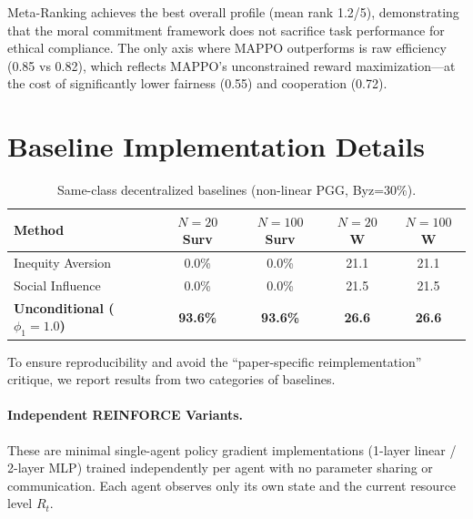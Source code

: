 \documentclass{article}
\begin{document}
\noindent Meta-Ranking achieves the best overall profile (mean rank 1.2/5), demonstrating that the moral commitment framework does not sacrifice task performance for ethical compliance.
The only axis where MAPPO outperforms is raw efficiency (0.85 vs 0.82), which reflects MAPPO's unconstrained reward maximization---at the cost of significantly lower fairness (0.55) and cooperation (0.72).

\section{Baseline Implementation Details}
\label{app:baselines}

\begin{table}[h]
\centering
\caption{Same-class decentralized baselines (non-linear PGG, Byz=30\%).}
\label{tab:baselines}
\begin{tabular}{lcccc}
\toprule
\textbf{Method} & \textbf{$N{=}20$ Surv} & \textbf{$N{=}100$ Surv} & \textbf{$N{=}20$ W} & \textbf{$N{=}100$ W} \\
\midrule
Inequity Aversion & 0.0\% & 0.0\% & 21.1 & 21.1 \\
Social Influence & 0.0\% & 0.0\% & 21.5 & 21.5 \\
\midrule
\textbf{Unconditional ($\phi_1{=}1.0$)} & \textbf{93.6\%} & \textbf{93.6\%} & \textbf{26.6} & \textbf{26.6} \\
\bottomrule
\end{tabular}
\end{table}

To ensure reproducibility and avoid the ``paper-specific reimplementation'' critique, we report results from two categories of baselines.

\paragraph{Independent REINFORCE Variants.}
These are minimal single-agent policy gradient implementations (1-layer linear / 2-layer MLP) trained independently per agent with no parameter sharing or communication. Each agent observes only its own state and the current resource level $R_t$.
\end{document}
